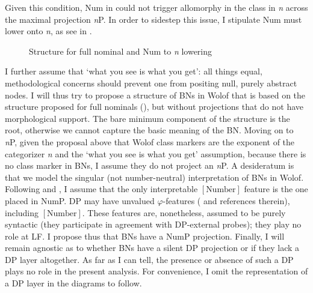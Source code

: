 \documentclass[output=paper]{langscibook}
\begin{document}
Given this condition, Num in  could not trigger allomorphy in the class in \textit{n} across the maximal projection \textit{n}P. In order to sidestep this issue, I stipulate Num must lower \citep{embick2001movement} onto \textit{n}, as see in .
			
\begin{figure}
    \centering
    \caption{Structure for full nominal and Num to \textit{n} lowering}
    \label{fig:FoOlNomFGgg}
\end{figure}
			
I further assume that `what you see is what you get': all things equal, methodological concerns should prevent one from positing null, purely abstract nodes. I will thus try to propose a structure of BNs in Wolof that is based on the structure proposed for full nominals (), but without projections that do not have morphological support. The bare minimum component of the structure is the root, otherwise we cannot capture the basic meaning of the BN. Moving on to \textit{n}P, given the proposal above that Wolof class markers are the exponent of the categorizer \textit{n} and the `what you see is what you get' assumption, because there is no class marker in BNs, I assume they do not project an \textit{n}P. A desideratum is that we model the singular (not number-neutral) interpretation of BNs in Wolof. Following \citet{ritter1991} and \citet{harbour2011valence}, I assume that the only interpretable $[\mbox{Number}]$ feature is the one placed in NumP. DP may have unvalued $\varphi$-features (\citealt{harbour2011valence} and references therein), including $[\mbox{Number}]$. These features are, nonetheless, assumed to be purely syntactic (they participate in agreement with DP-external probes); they play no role at LF. I propose thus that BNs have a NumP projection. Finally, I will remain agnostic as to whether BNs have a silent DP projection or if they lack a DP layer altogether. As far as I can tell, the presence or absence of such a DP plays no role in the present analysis. For convenience, I omit the representation of a DP layer in the diagrams to follow.
\end{document}

